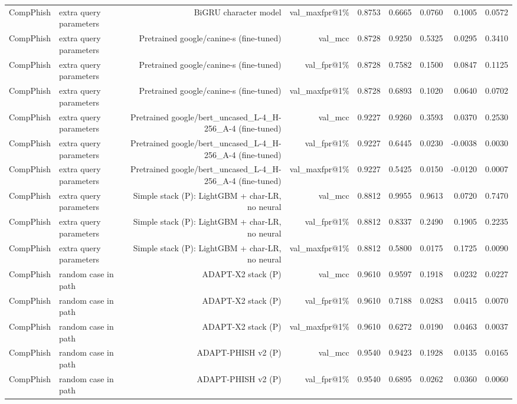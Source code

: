 \begin{table}[t]
\begin{tabular}{llrrrrrrr}
CompPhish & extra query parameters & BiGRU character model & val\_maxfpr@1\% & 0.8753 & 0.6665 & 0.0760 & 0.1005 & 0.0572 \\
CompPhish & extra query parameters & Pretrained google/canine-s (fine-tuned) & val\_mcc & 0.8728 & 0.9250 & 0.5325 & 0.0295 & 0.3410 \\
CompPhish & extra query parameters & Pretrained google/canine-s (fine-tuned) & val\_fpr@1\% & 0.8728 & 0.7582 & 0.1500 & 0.0847 & 0.1125 \\
CompPhish & extra query parameters & Pretrained google/canine-s (fine-tuned) & val\_maxfpr@1\% & 0.8728 & 0.6893 & 0.1020 & 0.0640 & 0.0702 \\
CompPhish & extra query parameters & Pretrained google/bert\_uncased\_L-4\_H-256\_A-4 (fine-tuned) & val\_mcc & 0.9227 & 0.9260 & 0.3593 & 0.0370 & 0.2530 \\
CompPhish & extra query parameters & Pretrained google/bert\_uncased\_L-4\_H-256\_A-4 (fine-tuned) & val\_fpr@1\% & 0.9227 & 0.6445 & 0.0230 & -0.0038 & 0.0030 \\
CompPhish & extra query parameters & Pretrained google/bert\_uncased\_L-4\_H-256\_A-4 (fine-tuned) & val\_maxfpr@1\% & 0.9227 & 0.5425 & 0.0150 & -0.0120 & 0.0007 \\
CompPhish & extra query parameters & Simple stack (P): LightGBM + char-LR, no neural & val\_mcc & 0.8812 & 0.9955 & 0.9613 & 0.0720 & 0.7470 \\
CompPhish & extra query parameters & Simple stack (P): LightGBM + char-LR, no neural & val\_fpr@1\% & 0.8812 & 0.8337 & 0.2490 & 0.1905 & 0.2235 \\
CompPhish & extra query parameters & Simple stack (P): LightGBM + char-LR, no neural & val\_maxfpr@1\% & 0.8812 & 0.5800 & 0.0175 & 0.1725 & 0.0090 \\
CompPhish & random case in path & ADAPT-X2 stack (P) & val\_mcc & 0.9610 & 0.9597 & 0.1918 & 0.0232 & 0.0227 \\
CompPhish & random case in path & ADAPT-X2 stack (P) & val\_fpr@1\% & 0.9610 & 0.7188 & 0.0283 & 0.0415 & 0.0070 \\
CompPhish & random case in path & ADAPT-X2 stack (P) & val\_maxfpr@1\% & 0.9610 & 0.6272 & 0.0190 & 0.0463 & 0.0037 \\
CompPhish & random case in path & ADAPT-PHISH v2 (P) & val\_mcc & 0.9540 & 0.9423 & 0.1928 & 0.0135 & 0.0165 \\
CompPhish & random case in path & ADAPT-PHISH v2 (P) & val\_fpr@1\% & 0.9540 & 0.6895 & 0.0262 & 0.0360 & 0.0060 \\

\end{tabular}
\end{table}
